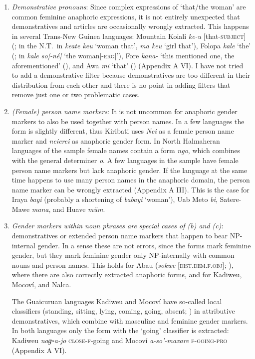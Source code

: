 \documentclass[output=collectionpaper]{langsci/langscibook}
\begin{document}
\begin{enumerate}[label=(\alph*)]
\item
\emph{Demonstrative pronouns}: Since complex expressions of ‘that/the woman’ are common feminine anaphoric expressions, it is not entirely unexpected that demonstratives and articles are occasionally wrongly extracted. This happens in several Trans-New Guinea languages: Mountain Koiali \textit{ke-u} [that-\textsc{subject}] (\citealt[428]{Garland1975}; in the N.T.\ in \textit{keate keu} ‘woman that’, \textit{ma keu} ‘girl that’), Folopa \textit{kale} ‘the’ (\citealt[85]{Anderson1989}; in \textit{kale so[-né]} ‘the woman[-\textsc{erg}]’), Fore \textit{kana-}
‘this mentioned one, the aforementioned’ (\citealt[45]{Scott1989}), and Awa \textit{mi} ‘that’ (\citealt{Lowing1975}) (Appendix A VI). I have not tried to add a demonstrative filter because demonstratives are too different in their distribution from each other and there is no point in adding filters that remove just one or two problematic cases.
\item
\emph{(Female) person name markers}: It is not uncommon for anaphoric gender markers to also be used together with person names. In a few languages the form is slightly different, thus Kiribati uses \textit{Nei} as a female person name marker and \textit{neierei} as anaphoric gender form. In North Halmaheran languages of the sample female names contain a form \textit{ngo}, which combines with the general determiner \textit{o}. A few languages in the sample have female person name markers but lack anaphoric gender. If the language at the same time happens to use many person names in the anaphoric domain, the person name marker can be wrongly extracted (Appendix A III). This is the case for Iraya \textit{bayi} (probably a shortening of \textit{babayi} ‘woman’), Uab Meto \textit{bi}, Satere-Mawe \textit{mana}, and Huave \textit{müm}.
\item
\emph{Gender markers within noun phrases are special cases of (b) and (c)}: demonstratives or extended person name markers that happen to bear NP-internal gender. In a sense these are not errors, since the forms mark feminine gender, but they mark feminine gender only NP-internally with common nouns and person names. This holds for Abau (\textit{sokwe} [\textsc{dist.dem.f.obj}]; \citealt[87]{Lock2011}), where there are also correctly extracted anaphoric forms, and for Kadiweu, Mocoví, and Nalca.

The Guaicuruan languages Kadiweu and Mocoví have so-called local classifiers (standing, sitting, lying, coming, going, absent; \citealt[62]{Sandalo1997}) in attributive demonstratives, which combine with masculine and feminine gender markers. In both languages only the form with the ‘going’ classifier is extracted: Kadiweu \textit{naɡ̶-a-jo} \textsc{close-f}-going and Mocoví \textit{a-so'-maxare} \textsc{f-going-pro} (Appendix A VI).


\end{enumerate}
\end{document}
